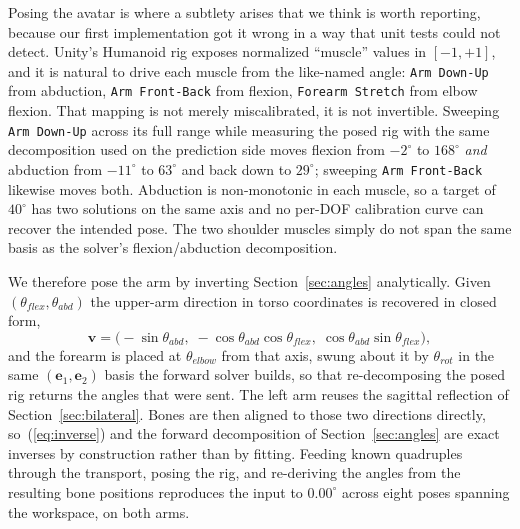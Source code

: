 \documentclass[conference]{IEEEtran}
\begin{document}
Posing the avatar is where a subtlety arises that we think is worth
reporting, because our first implementation got it wrong in a way that
unit tests could not detect. Unity's Humanoid rig exposes normalized
``muscle'' values in $[-1,+1]$, and it is natural to drive each muscle
from the like-named angle: \texttt{Arm Down-Up} from abduction,
\texttt{Arm Front-Back} from flexion, \texttt{Forearm Stretch} from elbow
flexion. That mapping is not merely miscalibrated, it is not invertible.
Sweeping \texttt{Arm Down-Up} across its full range while measuring the
posed rig with the same decomposition used on the prediction side moves
flexion from $-2^\circ$ to $168^\circ$ \emph{and} abduction from
$-11^\circ$ to $63^\circ$ and back down to $29^\circ$; sweeping
\texttt{Arm Front-Back} likewise moves both. Abduction is non-monotonic
in each muscle, so a target of $40^\circ$ has two solutions on the same
axis and no per-DOF calibration curve can recover the intended pose. The
two shoulder muscles simply do not span the same basis as the solver's
flexion/abduction decomposition.

We therefore pose the arm by inverting Section~\ref{sec:angles}
analytically. Given $(\theta_{flex}, \theta_{abd})$ the upper-arm
direction in torso coordinates is recovered in closed form,
\begin{equation}
\mathbf{v} = \bigl(-\sin\theta_{abd},\;
-\cos\theta_{abd}\cos\theta_{flex},\;
\cos\theta_{abd}\sin\theta_{flex}\bigr),
\label{eq:inverse}
\end{equation}
and the forearm is placed at $\theta_{elbow}$ from that axis, swung about
it by $\theta_{rot}$ in the same $(\mathbf{e}_1,\mathbf{e}_2)$ basis the
forward solver builds, so that re-decomposing the posed rig returns the
angles that were sent. The left arm reuses the sagittal reflection of
Section~\ref{sec:bilateral}. Bones are then aligned to those two
directions directly, so~(\ref{eq:inverse}) and the forward decomposition
of Section~\ref{sec:angles} are exact inverses by construction rather
than by fitting. Feeding known quadruples through the transport,
posing the rig, and re-deriving the angles from the resulting bone
positions reproduces the input to $0.00^\circ$ across eight poses
spanning the workspace, on both arms.
\end{document}
